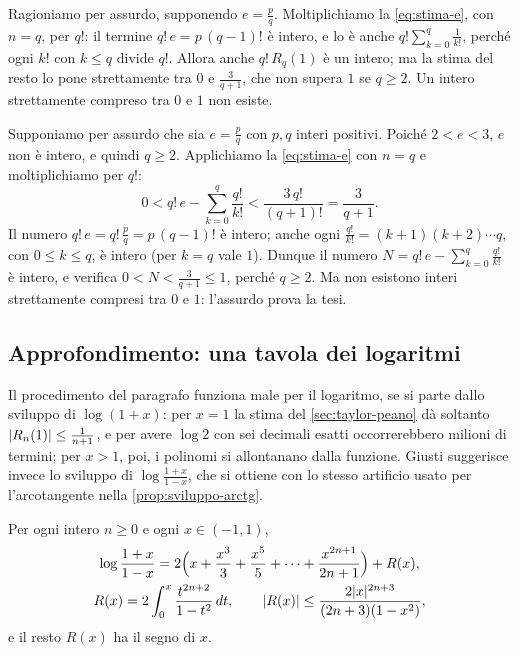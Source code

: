 \begin{schema}
\end{schema}

\begin{strategia}
Ragioniamo per assurdo, supponendo $e=\frac pq$. Moltiplichiamo la \eqref{eq:stima-e}, con
$n=q$, per $q!$: il termine $q!\,e=p\,(q-1)!$ è intero, e lo è anche $q!\sum_{k=0}^{q}\frac1{k!}$, perché
ogni $k!$ con $k\le q$ divide $q!$. Allora anche $q!\,R_{q}(1)$ è un intero; ma la stima del resto
lo pone strettamente tra $0$ e $\frac3{q+1}$, che non supera $1$ se $q\ge2$. Un intero
strettamente compreso tra $0$ e $1$ non esiste.
\end{strategia}

\begin{dimostrazione}
Supponiamo per assurdo che sia $e=\frac pq$ con $p,q$ interi positivi. Poiché $2<e<3$, $e$ non è
intero, e quindi $q\ge2$. Applichiamo la \eqref{eq:stima-e} con $n=q$ e moltiplichiamo per
$q!$:
\[
  0<q!\,e-\sum_{k=0}^{q}\frac{q!}{k!}<\frac{3\,q!}{(q+1)!}=\frac3{q+1} .
\]
Il numero $q!\,e=q!\,\frac pq=p\,(q-1)!$ è intero; anche ogni $\frac{q!}{k!}=(k+1)(k+2)\cdots q$, con
$0\le k\le q$, è intero (per $k=q$ vale $1$). Dunque il numero
$N=q!\,e-\sum_{k=0}^{q}\frac{q!}{k!}$ è intero, e verifica $0<N<\frac3{q+1}\le1$, perché $q\ge2$. Ma non
esistono interi strettamente compresi tra $0$ e $1$: l'assurdo prova la tesi.
\end{dimostrazione}

\subsection{Approfondimento: una tavola dei logaritmi}
\label{subsec:tavola-logaritmi}

Il procedimento del paragrafo funziona male per il logaritmo, se si parte dallo sviluppo
di $\log(1+x)$: per $x=1$ la stima del \cref{sec:taylor-peano} dà soltanto
$\lvert R_{n}(1)\rvert\le\frac1{n+1}$, e per avere $\log2$ con sei decimali esatti occorrerebbero milioni
di termini; per $x>1$, poi, i polinomi si allontanano dalla funzione. Giusti
\cite{giusti} suggerisce invece lo sviluppo di $\log\frac{1+x}{1-x}$, che si ottiene con lo stesso
artificio usato per l'arcotangente nella \cref{prop:sviluppo-arctg}.

\begin{proposizione}\label{prop:sviluppo-log-rapporto}
Per ogni intero $n\ge0$ e ogni $x\in(-1,1)$,
\begin{equation}\label{eq:sviluppo-log-rapporto}
\begin{gathered}
  \log\frac{1+x}{1-x}=2\Bigl(x+\frac{x^{3}}3+\frac{x^{5}}5+\dots+\frac{x^{2n+1}}{2n+1}\Bigr)+R(x),\\
  R(x)=2\int_{0}^{x}\frac{t^{2n+2}}{1-t^{2}}\,dt, \qquad
  \lvert R(x)\rvert\le\frac{2\lvert x\rvert^{2n+3}}{(2n+3)(1-x^{2})} ,
\end{gathered}
\end{equation}
e il resto $R(x)$ ha il segno di $x$.
\end{proposizione}

